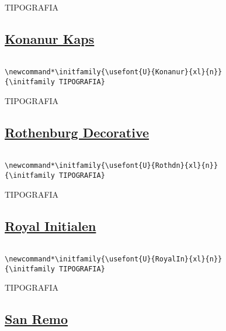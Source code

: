 \documentclass[a4paper]{article}
\newcommand{\tipo}{TIPOGRAFIA}
\begin{document}
{\initfamily\Huge \tipo}


\subsection*{\href{http://www.tug.dk/FontCatalogue/konanur/}{Konanur Kaps}}


\renewcommand*\initfamily{\usefont{U}{Konanur}{xl}{n}}

\begin{verbatim}

\newcommand*\initfamily{}
{\initfamily TIPOGRAFIA}
\end{verbatim}

{\initfamily\Huge \tipo}



\subsection*{\href{http://www.tug.dk/FontCatalogue/rothdn/}{Rothenburg Decorative}}


\renewcommand*\initfamily{\usefont{U}{Rothdn}{xl}{n}}

\begin{verbatim}

\newcommand*\initfamily{}
{\initfamily TIPOGRAFIA}
\end{verbatim}

{\initfamily\Huge \tipo}




\subsection*{\href{http://www.tug.dk/FontCatalogue/royalin/}{Royal Initialen}}


\renewcommand*\initfamily{\usefont{U}{RoyalIn}{xl}{n}}

\begin{verbatim}

\newcommand*\initfamily{}
{\initfamily TIPOGRAFIA}
\end{verbatim}

{\initfamily\Huge \tipo}




\subsection*{\href{http://www.tug.dk/FontCatalogue/sanremo/}{San Remo}}


\renewcommand*\initfamily{\usefont{U}{Sanremo}{xl}{n}}
\end{document}
